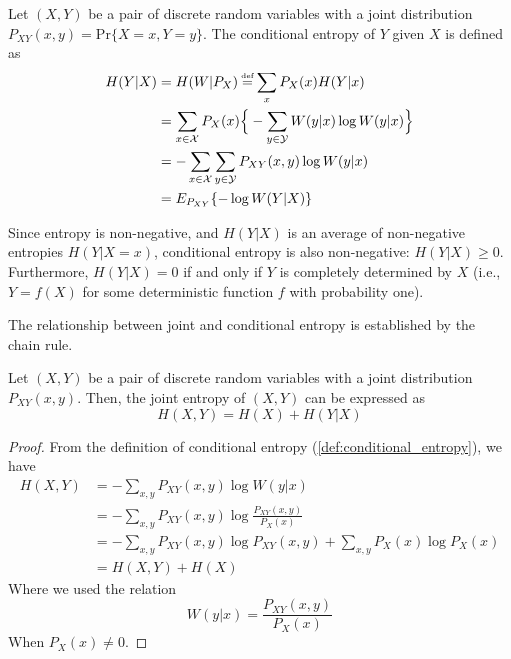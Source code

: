 \begin{definition}\label{def:conditional_entropy}
    Let $(X,Y)$ be a pair of discrete random variables with a joint distribution $P_{XY}(x,y) = \text{Pr}\{X=x,Y=y\}$. The conditional entropy of $Y$ given $X$ is defined as
    \begin{align*}
        H(Y|X) & = H(W | P_X) \myeq \sum_x P_X(x)H(Y|x)                                                       \\
               & = \sum_{x \in \mathcal{X}} P_X(x) \Big\{ -\sum_{y \in \mathcal{Y}} W(y|x) \log W(y|x) \Big\} \\
               & = -\sum_{x\in\mathcal{X}}\sum_{y\in\mathcal{Y}} P_{XY}(x,y)\log W(y|x)                       \\
               & = E_{P_{XY}} \{ -\log W(Y|X) \}
    \end{align*}
\end{definition}

Since entropy is non-negative, and $H(Y|X)$ is an average of non-negative entropies $H(Y|X=x)$, conditional entropy is also non-negative: $H(Y|X) \ge 0$. Furthermore, $H(Y|X) = 0$ if and only if $Y$ is completely determined by $X$ (i.e., $Y=f(X)$ for some deterministic function $f$ with probability one).

The relationship between joint and conditional entropy is established by the chain rule.

\begin{theorem}\label{thm:chain_rule}
    Let $(X,Y)$ be a pair of discrete random variables with a joint distribution $P_{XY}(x,y)$. Then, the joint entropy of $(X,Y)$ can be expressed as
    \begin{equation*}
        H(X,Y) = H(X) + H(Y|X)
    \end{equation*}
\end{theorem}
\begin{proof}
    From the definition of conditional entropy (\ref{def:conditional_entropy}), we have
    \begin{align*}
        H(X,Y) & = -\sum_{x,y} P_{XY}(x,y) \log W(y|x)                                        \\
               & = -\sum_{x,y} P_{XY}(x,y) \log \frac{P_{XY}(x,y)}{P_X(x)}                    \\
               & = -\sum_{x,y} P_{XY}(x,y) \log P_{XY}(x,y) + \sum_{x,y} P_{X}(x) \log P_X(x) \\
               & = H(X,Y) + H(X)
    \end{align*}
    Where we used the relation
    \begin{equation*}
        W(y|x) = \frac{P_{XY}(x,y)}{P_X(x)}
    \end{equation*}
    When $P_X(x) \neq 0$.
\end{proof}

